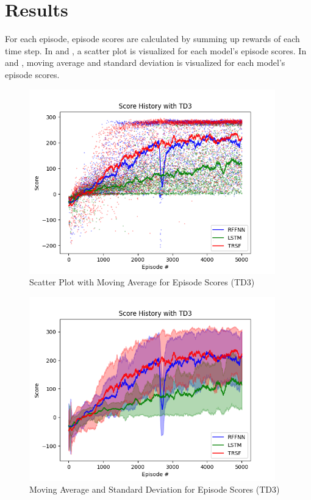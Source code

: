 \section{Results}

For each episode, episode scores are calculated by summing up rewards of each time step. 
In  and , a scatter plot is visualized for each model's episode scores. 
In  and , moving average and standard deviation is visualized for each model's episode scores. 

\begin{figure}
	\centering
	\includegraphics[width=0.95\textwidth]{figures/bipedal/SCATTER_TD3_RFFNN_LSTM_TRSF.png}
	\caption{Scatter Plot with Moving Average for Episode Scores (TD3)}
	\label{fig:td3_scatter_ep_rewards}
\end{figure}
\begin{figure}
	\centering
	\includegraphics[width=0.95\textwidth]{figures/bipedal/STD_TD3_RFFNN_LSTM_TRSF.png}
	\caption{Moving Average and Standard Deviation for Episode Scores (TD3)}
	\label{fig:td3_std_ep_rewards}
\end{figure} 

